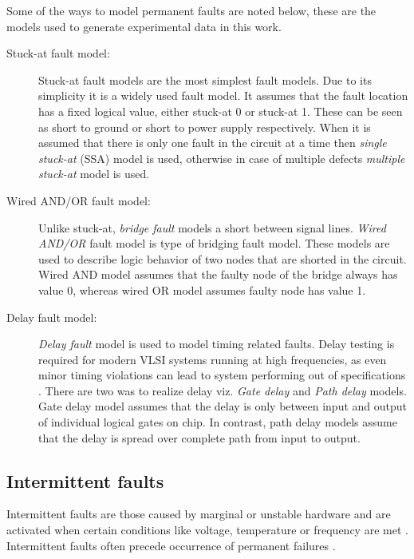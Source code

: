 Some of the ways to model permanent faults are noted below, these are the models used to generate experimental data in this work.
\begin{description}
\item[Stuck-at fault model:]
Stuck-at fault models are the most simplest fault models. Due to its simplicity it is a widely used fault model\cite{Larsson2006}. It assumes that the fault location has a fixed logical value, either stuck-at 0 or stuck-at 1. These can be seen as short to ground or short to power supply respectively. When it is assumed that there is only one fault in the circuit at a time then \emph{single stuck-at} (SSA) model is used, otherwise in case of multiple defects \emph{multiple stuck-at} model is used.

\item[Wired AND/OR fault model:]
Unlike stuck-at, \emph{bridge fault} models a short between signal lines. \emph{Wired AND/OR} fault model is type of bridging fault model. These models are used to describe logic behavior of two nodes that are shorted in the circuit. Wired AND model assumes that the faulty node of the bridge always has value 0, whereas wired OR model assumes faulty node has value 1. 

\item[Delay fault model:]
\emph{Delay fault} model is used to model timing related faults. Delay testing is required for modern VLSI systems running at high frequencies, as even minor timing violations can lead to system performing out of specifications \cite{Larsson2006}. There are two was to realize delay viz. \emph{Gate delay} and \emph{Path delay} models. Gate delay model assumes that the delay is only between input and output of individual logical gates on chip. In contrast, path delay models assume that the delay is spread over complete path from input to output. 
\end{description}
\subsection{Intermittent faults}
\label{sec:secif}
Intermittent faults are those caused by marginal or unstable hardware and are activated when certain conditions like voltage, temperature or frequency are met \cite{Constantinescu2003, Lehtonen2009}. Intermittent faults often precede occurrence of permanent failures \cite{Lehtonen2009}.

